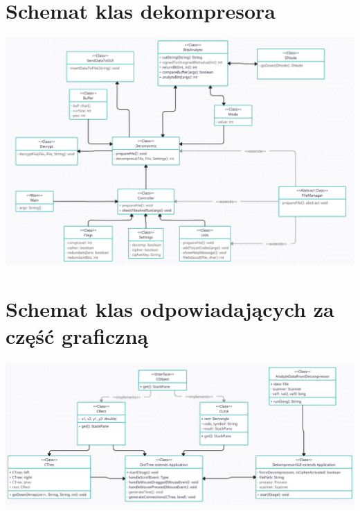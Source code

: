 \documentclass[]{article}
\begin{document}
\section{Schemat klas dekompresora}\label{header-n231}
\includegraphics[width=\textwidth]{classes1.png}

\section{Schemat klas odpowiadających za część graficzną}\label{header-n231}
\includegraphics[width=\textwidth]{classes2.png}
\end{document}
